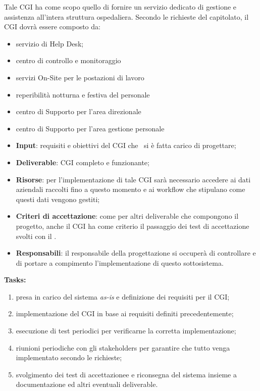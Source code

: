 		Tale CGI ha come scopo quello di fornire un servizio dedicato di gestione e assistenza all'intera struttura ospedaliera.
		Secondo le richieste del capitolato, il CGI dovrà essere composto da:
		\begin{itemize}[noitemsep]
			\renewcommand\labelitemi{--}
			\item servizio di Help Desk;
			\item centro di controllo e monitoraggio
			\item servizi On-Site per le postazioni di lavoro
			\item reperibilità notturna e festiva del personale
			\item centro di Supporto per l'area direzionale
			\item centro di Supporto per l'area gestione personale
		\end{itemize}
	
		\begin{itemize}[noitemsep]
			\renewcommand\labelitemi{--}
			\item \textbf{Input}: requisiti e obiettivi del CGI che \azienda~si è fatta carico di progettare;
			\item \textbf{Deliverable}: CGI completo e funzionante;
			\item \textbf{Risorse}: per l'implementazione di tale CGI sarà necessario accedere ai dati aziendali raccolti fino a questo momento e ai workflow che stipulano come questi dati vengono gestiti;
			\item \textbf{Criteri di accettazione}: come per altri deliverable che compongono il progetto, anche il CGI ha come criterio il passaggio dei test di accettazione svolti con il \proponente.
			\item \textbf{Responsabili}: il responsabile della progettazione si occuperà di controllare e di portare a compimento l'implementazione di questo sottosistema.
		\end{itemize}
		
		\textbf{Tasks:}
		\begin{enumerate}[noitemsep]
			\item presa in carico del sistema \textit{as-is} e definizione dei requisiti per il CGI;
			\item implementazione del CGI in base ai requisiti definiti precedentemente;
			\item esecuzione di test periodici per verificarne la corretta implementazione;
			\item riunioni periodiche con gli stakeholders per garantire che tutto venga implementato secondo le richieste;
			\item svolgimento dei test di accettazionee e riconsegna del sistema insieme a documentazione ed altri eventuali deliverable.
		\end{enumerate}
	
